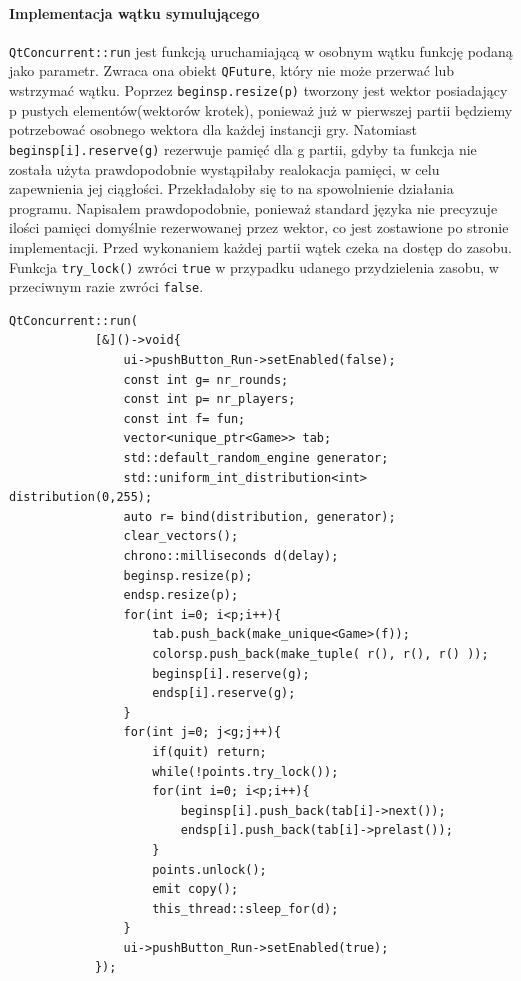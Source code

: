 \paragraph{Implementacja wątku symulującego} \texttt{QtConcurrent::run} jest funkcją uruchamiającą w osobnym wątku funkcję podaną jako parametr. Zwraca ona obiekt \texttt{QFuture}, który nie może przerwać lub wstrzymać wątku. Poprzez \texttt{beginsp.resize(p)} tworzony jest wektor posiadający p pustych elementów(wektorów krotek), ponieważ już w pierwszej partii będziemy potrzebować osobnego wektora dla każdej instancji gry. Natomiast \texttt{beginsp[i].reserve(g)} rezerwuje pamięć dla g partii, gdyby ta funkcja nie została użyta prawdopodobnie wystąpiłaby realokacja pamięci, w celu zapewnienia jej ciągłości. Przekładałoby się to na spowolnienie działania programu. Napisałem prawdopodobnie, ponieważ standard języka nie precyzuje ilości pamięci domyślnie rezerwowanej przez wektor, co jest zostawione po stronie implementacji. Przed wykonaniem każdej partii wątek czeka na dostęp do zasobu. Funkcja \texttt{try\_lock()} zwróci \texttt{true} w przypadku udanego przydzielenia zasobu, w przeciwnym razie zwróci \texttt{false}. 
\begin{lstlisting}
QtConcurrent::run(
            [&]()->void{
                ui->pushButton_Run->setEnabled(false);
                const int g= nr_rounds;
                const int p= nr_players;
                const int f= fun;
                vector<unique_ptr<Game>> tab;
                std::default_random_engine generator;
                std::uniform_int_distribution<int> distribution(0,255);
                auto r= bind(distribution, generator);
                clear_vectors();
                chrono::milliseconds d(delay);
                beginsp.resize(p);
                endsp.resize(p);
                for(int i=0; i<p;i++){
                    tab.push_back(make_unique<Game>(f));
                    colorsp.push_back(make_tuple( r(), r(), r() ));
                    beginsp[i].reserve(g);
                    endsp[i].reserve(g);
                }
                for(int j=0; j<g;j++){
                    if(quit) return;
                    while(!points.try_lock());
                    for(int i=0; i<p;i++){
                        beginsp[i].push_back(tab[i]->next());
                        endsp[i].push_back(tab[i]->prelast());
                    }
                    points.unlock();
                    emit copy();
                    this_thread::sleep_for(d);
                }
                ui->pushButton_Run->setEnabled(true);
            });
\end{lstlisting}

